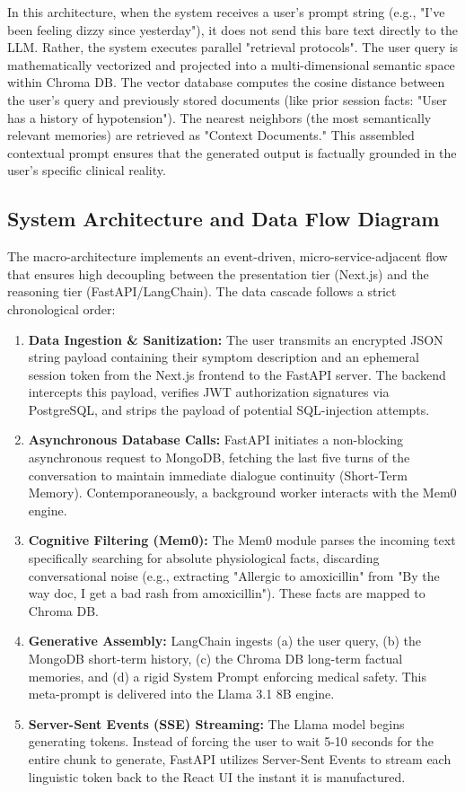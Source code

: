 \documentclass[12pt]{article}
\begin{document}
In this architecture, when the system receives a user's prompt string (e.g., "I've been feeling dizzy since yesterday"), it does not send this bare text directly to the LLM. Rather, the system executes parallel "retrieval protocols". The user query is mathematically vectorized and projected into a multi-dimensional semantic space within Chroma DB. The vector database computes the cosine distance between the user’s query and previously stored documents (like prior session facts: "User has a history of hypotension"). The nearest neighbors (the most semantically relevant memories) are retrieved as "Context Documents." This assembled contextual prompt ensures that the generated output is factually grounded in the user's specific clinical reality.

\subsection{System Architecture and Data Flow Diagram}
The macro-architecture implements an event-driven, micro-service-adjacent flow that ensures high decoupling between the presentation tier (Next.js) and the reasoning tier (FastAPI/LangChain). The data cascade follows a strict chronological order:

\begin{enumerate}
    \item \textbf{Data Ingestion \& Sanitization:} The user transmits an encrypted JSON string payload containing their symptom description and an ephemeral session token from the Next.js frontend to the FastAPI server. The backend intercepts this payload, verifies JWT authorization signatures via PostgreSQL, and strips the payload of potential SQL-injection attempts.
    \item \textbf{Asynchronous Database Calls:} FastAPI initiates a non-blocking asynchronous request to MongoDB, fetching the last five turns of the conversation to maintain immediate dialogue continuity (Short-Term Memory). Contemporaneously, a background worker interacts with the Mem0 engine.
    \item \textbf{Cognitive Filtering (Mem0):} The Mem0 module parses the incoming text specifically searching for absolute physiological facts, discarding conversational noise (e.g., extracting "Allergic to amoxicillin" from "By the way doc, I get a bad rash from amoxicillin"). These facts are mapped to Chroma DB.
    \item \textbf{Generative Assembly:} LangChain ingests (a) the user query, (b) the MongoDB short-term history, (c) the Chroma DB long-term factual memories, and (d) a rigid System Prompt enforcing medical safety. This meta-prompt is delivered into the Llama 3.1 8B engine.
    \item \textbf{Server-Sent Events (SSE) Streaming:} The Llama model begins generating tokens. Instead of forcing the user to wait 5-10 seconds for the entire chunk to generate, FastAPI utilizes Server-Sent Events to stream each linguistic token back to the React UI the instant it is manufactured.
\end{enumerate}
\end{document}
